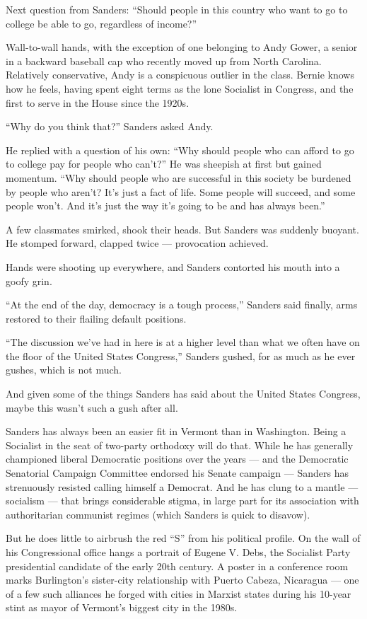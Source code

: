 Next question from Sanders: ``Should people in this country who want to
go to college be able to go, regardless of income?''

Wall-to-wall hands, with the exception of one belonging to Andy Gower, a
senior in a backward baseball cap who recently moved up from North
Carolina. Relatively conservative, Andy is a conspicuous outlier in the
class. Bernie knows how he feels, having spent eight terms as the lone
Socialist in Congress, and the first to serve in the House since the
1920s.

``Why do you think that?'' Sanders asked Andy.

He replied with a question of his own: ``Why should people who can
afford to go to college pay for people who can't?'' He was sheepish at
first but gained momentum. ``Why should people who are successful in
this society be burdened by people who aren't? It's just a fact of life.
Some people will succeed, and some people won't. And it's just the way
it's going to be and has always been.''

A few classmates smirked, shook their heads. But Sanders was suddenly
buoyant. He stomped forward, clapped twice --- provocation achieved.

Hands were shooting up everywhere, and Sanders contorted his mouth into
a goofy grin.

``At the end of the day, democracy is a tough process,'' Sanders said
finally, arms restored to their flailing default positions.

``The discussion we've had in here is at a higher level than what we
often have on the floor of the United States Congress,'' Sanders gushed,
for as much as he ever gushes, which is not much.

And given some of the things Sanders has said about the United States
Congress, maybe this wasn't such a gush after all.

Sanders has always been an easier fit in Vermont than in Washington.
Being a Socialist in the seat of two-party orthodoxy will do that. While
he has generally championed liberal Democratic positions over the years
--- and the Democratic Senatorial Campaign Committee endorsed his Senate
campaign --- Sanders has strenuously resisted calling himself a
Democrat. And he has clung to a mantle --- socialism --- that brings
considerable stigma, in large part for its association with
authoritarian communist regimes (which Sanders is quick to disavow).

But he does little to airbrush the red ``S'' from his political profile.
On the wall of his Congressional office hangs a portrait of Eugene V.
Debs, the Socialist Party presidential candidate of the early 20th
century. A poster in a conference room marks Burlington's sister-city
relationship with Puerto Cabeza, Nicaragua --- one of a few such
alliances he forged with cities in Marxist states during his 10-year
stint as mayor of Vermont's biggest city in the 1980s.


